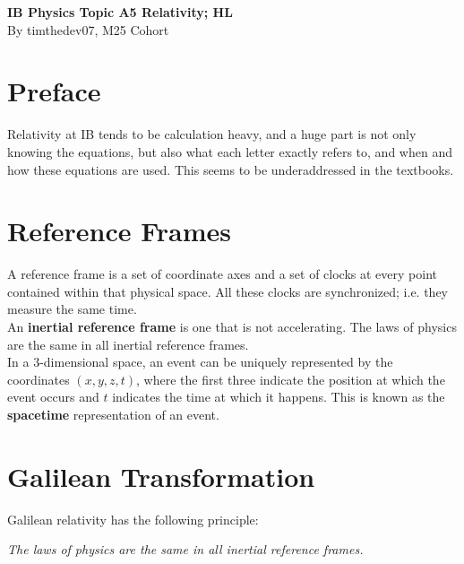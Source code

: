\documentclass[a4paper,12pt]{article}
\let\oldsection\section
\renewcommand\section{\clearpage\oldsection}
\newcommand{\lb}{\\[8pt]}
\begin{document}
\pagestyle{fancy}


\begin{titlepage}
  \begin{center}

    \vspace*{8cm}
    \textbf{\Large {IB Physics Topic A5 Relativity; HL}} \\
    \vspace*{1cm}
    \large{By timthedev07, M25 Cohort}

  \end{center}
\end{titlepage}


\pagebreak
\section*{Preface}
Relativity at IB tends to be calculation heavy, and a huge part is not only knowing the equations, but also what each letter exactly refers to, and when and how these equations are used. This seems to be underaddressed in the textbooks.
\pagebreak
\tableofcontents
\pagebreak

\clearpage
\setcounter{page}{1}

\section{Reference Frames}

A reference frame is a set of coordinate axes and a set of clocks at every point contained within that physical space. All these clocks are synchronized; i.e. they measure the same time.\lb
An \textbf{inertial reference frame} is one that is not accelerating. The laws of physics are the same in all inertial reference frames. \lb
In a 3-dimensional space, an event can be uniquely represented by the coordinates $(x, y, z, t)$, where the first three indicate the position at which the event occurs and $t$ indicates the time at which it happens. This is known as the \textbf{spacetime} representation of an event.

\section{Galilean Transformation}
Galilean relativity has the following principle:
\begin{center}
  \textit{The laws of physics are the same in all inertial reference frames.}
\end{center}
\end{document}
